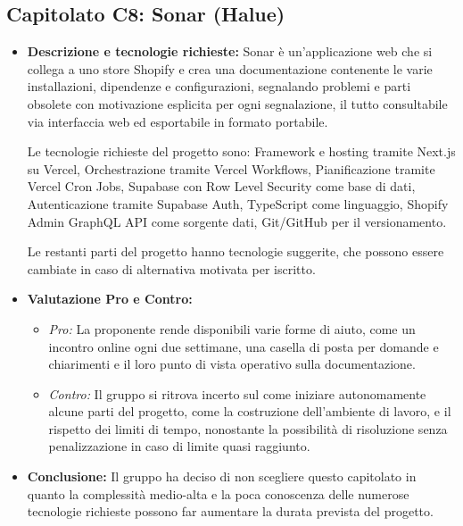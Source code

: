 \documentclass[12pt,a4paper]{article}
\newcommand{\tightlist}{\setlength{\itemsep}{1pt}\setlength{\parskip}{0pt}}
\begin{document}
\hypertarget{capitolato-c8}{%
\subsection{Capitolato C8: Sonar (Halue)}}
\begin{itemize}
\tightlist
\item \textbf{Descrizione e tecnologie richieste:} Sonar è un'applicazione web che si collega a uno store Shopify e crea una documentazione contenente le varie installazioni, dipendenze e configurazioni, segnalando problemi e parti obsolete con motivazione esplicita per ogni segnalazione, il tutto consultabile via interfaccia web ed esportabile in formato portabile.

Le tecnologie richieste del progetto sono:
Framework e hosting tramite Next.js su Vercel, Orchestrazione tramite Vercel Workflows, Pianificazione tramite Vercel Cron Jobs, Supabase con Row Level Security come base di dati, Autenticazione tramite Supabase Auth,
TypeScript come linguaggio, Shopify Admin GraphQL API come sorgente dati,
Git/GitHub per il versionamento.

Le restanti parti del progetto hanno tecnologie suggerite, che possono essere cambiate in caso di alternativa motivata per iscritto.

\item \textbf{Valutazione Pro e Contro:}
  \begin{itemize}
  \tightlist
  \item \emph{Pro:} La proponente rende disponibili varie forme di aiuto, come un incontro online ogni due settimane, una casella di posta per domande e chiarimenti e il loro punto di vista operativo sulla documentazione.

  \item \emph{Contro:} Il gruppo si ritrova incerto sul come iniziare autonomamente alcune parti del progetto, come la costruzione dell’ambiente di lavoro, e il rispetto dei limiti di tempo, nonostante la possibilità di risoluzione senza penalizzazione in caso di limite quasi raggiunto.

  \end{itemize}
\item \textbf{Conclusione:} Il gruppo ha deciso di non scegliere questo capitolato in quanto la complessità medio-alta e la poca conoscenza delle numerose tecnologie richieste possono far aumentare la durata prevista del progetto.

\end{itemize}
\end{document}
